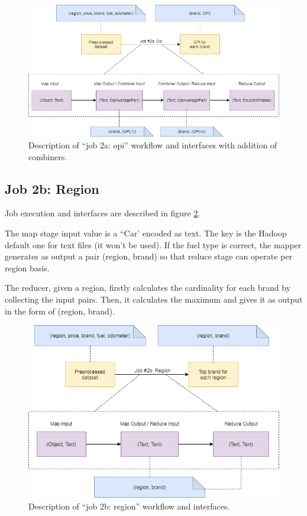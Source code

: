 \begin{figure}[H]
	\centering
	\includegraphics[scale=0.6]{images/2-mapreduce/MR-job-2a-combiner.png}
	\caption{Description of ``job 2a: opi'' workflow and interfaces with addition of combiners.}
	\label{fig:MR-job-2a-combiner}
\end{figure}   

\subsection{Job 2b: Region}

Job execution and interfaces are described in figure \ref{fig:MR-job-2b}.

The map stage input value is a ``Car' encoded as text. The key is the Hadoop default one for text files (it won't be used). If the fuel type is correct, the mapper generates as output a pair (region, brand) so that reduce stage can operate per region basis.

The reducer, given a region, firstly calculates the cardinality for each brand by collecting the input pairs. Then, it calculates the maximum and gives it as output in the form of (region, brand).

\begin{figure}[H]
	\centering
	\includegraphics[scale=0.7]{images/2-mapreduce/MR-job-2b.png}
	\caption{Description of ``job 2b: region'' workflow and interfaces.}
	\label{fig:MR-job-2b}
\end{figure}  

